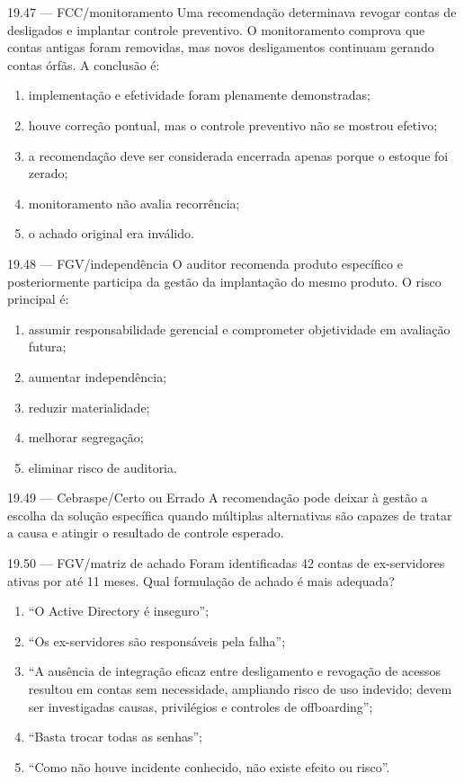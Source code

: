 \begin{questao}{ 19.47 — FCC/monitoramento}
Uma recomendação determinava revogar contas de desligados e implantar controle preventivo. O monitoramento comprova que contas antigas foram removidas, mas novos desligamentos continuam gerando contas órfãs. A conclusão é:
\begin{enumerate}[label=\Alph*)]
\item implementação e efetividade foram plenamente demonstradas;
\item houve correção pontual, mas o controle preventivo não se mostrou efetivo;
\item a recomendação deve ser considerada encerrada apenas porque o estoque foi zerado;
\item monitoramento não avalia recorrência;
\item o achado original era inválido.
\end{enumerate}
\end{questao}

\begin{questao}{ 19.48 — FGV/independência}
O auditor recomenda produto específico e posteriormente participa da gestão da implantação do mesmo produto. O risco principal é:
\begin{enumerate}[label=\Alph*)]
\item assumir responsabilidade gerencial e comprometer objetividade em avaliação futura;
\item aumentar independência;
\item reduzir materialidade;
\item melhorar segregação;
\item eliminar risco de auditoria.
\end{enumerate}
\end{questao}

\begin{questao}{ 19.49 — Cebraspe/Certo ou Errado}
A recomendação pode deixar à gestão a escolha da solução específica quando múltiplas alternativas são capazes de tratar a causa e atingir o resultado de controle esperado.
\end{questao}

\begin{questao}{ 19.50 — FGV/matriz de achado}
Foram identificadas 42 contas de ex-servidores ativas por até 11 meses. Qual formulação de achado é mais adequada?
\begin{enumerate}[label=\Alph*)]
\item ``O Active Directory é inseguro'';
\item ``Os ex-servidores são responsáveis pela falha'';
\item ``A ausência de integração eficaz entre desligamento e revogação de acessos resultou em contas sem necessidade, ampliando risco de uso indevido; devem ser investigadas causas, privilégios e controles de offboarding'';
\item ``Basta trocar todas as senhas'';
\item ``Como não houve incidente conhecido, não existe efeito ou risco''.
\end{enumerate}
\end{questao}

